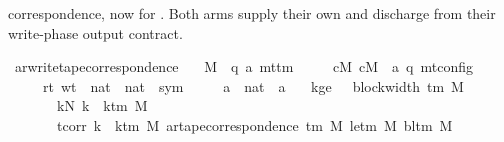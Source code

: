 \begin{isabellebody}
\begin{isamarkuptext}
  correspondence, now for .  Both arms supply their own
   and discharge  from their write-phase
  output contract.%
\end{isamarkuptext}\isamarkuptrue%
\isamarkupfalse%
\ ar{\isacharunderscore}{\kern0pt}write{\isacharunderscore}{\kern0pt}tape{\isacharunderscore}{\kern0pt}correspondence{\isacharcolon}{\kern0pt}\isanewline
\ \ \ M\ {\isacharcolon}{\kern0pt}{\isacharcolon}{\kern0pt}\ {\isachardoublequoteopen}{\isacharparenleft}{\kern0pt}{\isacharprime}{\kern0pt}q{\isacharcomma}{\kern0pt}\ {\isacharprime}{\kern0pt}a{\isacharparenright}{\kern0pt}\ mttm{\isachardoublequoteclose}\isanewline
\ \ \ \ \ cM\ cM{\isacharunderscore}{\kern0pt}{}\ {\isacharcolon}{\kern0pt}{\isacharcolon}{\kern0pt}\ {\isachardoublequoteopen}{\isacharparenleft}{\kern0pt}{\isacharprime}{\kern0pt}a{\isacharcomma}{\kern0pt}\ {\isacharprime}{\kern0pt}q{\isacharparenright}{\kern0pt}\ mt{\isacharunderscore}{\kern0pt}config{\isachardoublequoteclose}\isanewline
\ \ \ \ \ rt\ wt\ {\isacharcolon}{\kern0pt}{\isacharcolon}{\kern0pt}\ {\isachardoublequoteopen}nat\ {\isasymRightarrow}\ nat\ {\isasymRightarrow}\ sym{}{\isachardoublequoteclose}\isanewline
\ \ \ \ \ a{\isacharprime}{\kern0pt}\ {\isacharcolon}{\kern0pt}{\isacharcolon}{\kern0pt}\ {\isachardoublequoteopen}nat\ {\isasymRightarrow}\ {\isacharprime}{\kern0pt}a{\isachardoublequoteclose}\isanewline
\ \ \ kge{}{\isacharcolon}{\kern0pt}\ {\isachardoublequoteopen}{}\ {\isasymle}\ block{\isacharunderscore}{\kern0pt}width\ {\isacharparenleft}{\kern0pt}{\isasymGamma}{\isacharunderscore}{\kern0pt}tm\ M{\isacharparenright}{\kern0pt}{\isachardoublequoteclose}\isanewline
\ \ \ \ \ \ \ kN{\isacharcolon}{\kern0pt}\ {\isachardoublequoteopen}k\ {\isacharless}{\kern0pt}\ k{\isacharunderscore}{\kern0pt}tm\ M{\isachardoublequoteclose}\isanewline
\ \ \ \ \ \ \ tcorr{\isacharcolon}{\kern0pt}\ {\isachardoublequoteopen}{\isasymforall}k\ {\isacharless}{\kern0pt}\ k{\isacharunderscore}{\kern0pt}tm\ M{\isachardot}{\kern0pt}\ ar{\isacharunderscore}{\kern0pt}tape{\isacharunderscore}{\kern0pt}correspondence\ {\isacharparenleft}{\kern0pt}{\isasymGamma}{\isacharunderscore}{\kern0pt}tm\ M{\isacharparenright}{\kern0pt}\ {\isacharparenleft}{\kern0pt}le{\isacharunderscore}{\kern0pt}tm\ M{\isacharparenright}{\kern0pt}\ {\isacharparenleft}{\kern0pt}bl{\isacharunderscore}{\kern0pt}tm\ M{\isacharparenright}{\kern0pt}\isanewline

\end{isabellebody}
